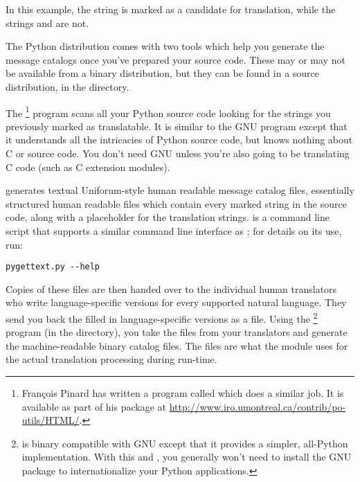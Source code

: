 In this example, the string  is marked as
a candidate for translation, while the strings  and
 are not.

The Python distribution comes with two tools which help you generate
the message catalogs once you've prepared your source code.  These may
or may not be available from a binary distribution, but they can be
found in a source distribution, in the  directory.

The \footnote{Fran\c cois Pinard has
written a program called
 which does a similar job.  It is available as part of
his  package at
\url{http://www.iro.umontreal.ca/contrib/po-utils/HTML/}.} program
scans all your Python source code looking for the strings you
previously marked as translatable.  It is similar to the GNU
 program except that it understands all the
intricacies of Python source code, but knows nothing about C or \Cpp
source code.  You don't need GNU  unless you're also
going to be translating C code (such as C extension modules).

 generates textual Uniforum-style human readable
message catalog  files, essentially structured human
readable files which contain every marked string in the source code,
along with a placeholder for the translation strings.
 is a command line script that supports a similar
command line interface as ; for details on its use,
run:

\begin{verbatim}
pygettext.py --help
\end{verbatim}

Copies of these  files are then handed over to the
individual human translators who write language-specific versions for
every supported natural language.  They send you back the filled in
language-specific versions as a  file.  Using the
\footnote{ is binary
compatible with GNU  except that it provides a
simpler, all-Python implementation.  With this and
, you generally won't need to install the GNU
 package to internationalize your Python
applications.} program (in the  directory), you take the
 files from your translators and generate the
machine-readable  binary catalog files.  The 
files are what the  module uses for the actual
translation processing during run-time.

